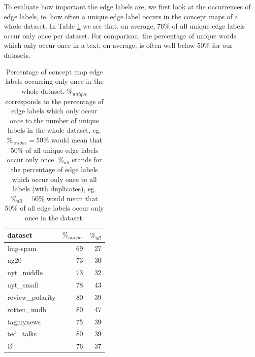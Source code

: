 
To evaluate how important the edge labels are, we first look at the occurrences of edge labels, ie. how often a unique edge label occurs in the concept maps of a whole dataset.
In Table \ref{table:edge_label_occurrences} we see that, on average, 76\% of all unique edge labels occur only once per dataset. For comparison, the percentage of unique words which only occur once in a text, on average, is often well below 50\% for our datasets.

\begin{table}[htb!]
	\centering
	\begin{tabular}{lrr}
		dataset &  $ \%_{unique} $ & $ \%_{all}$  \\
		\midrule
		ling-spam       & 69 & 27 \\
		ng20            & 73 & 30 \\
		nyt\_middle      & 73 & 32 \\
		nyt\_small       & 78 & 43 \\
		review\_polarity & 80 & 39 \\
		rotten\_imdb     & 80 & 47 \\
		tagmynews       & 75 & 39 \\
		ted\_talks       & 80 & 39 \\
		\midrule
		\O           & 76 & 37 \\
		\bottomrule
	\end{tabular}
	\caption[Statistics: Percentage of concept map labels occurring once]{Percentage of concept map edge labels occurring only once in the whole dataset.
		$ \%_{unique} $ corresponds to the percentage of edge labels which only occur once to the number of unique labels in the whole dataset, eg. $ \%_{unique} = 50\% $ would mean that 50\% of all unique edge labels occur only once.
		$ \%_{all}$ stands for the percentage of edge labels which occur only once to all labels (with duplicates), eg. $ \%_{all} = 50\%$ would mean that 50\% of all edge labels occur only once in the dataset.}\label{table:edge_label_occurrences}
\end{table}


